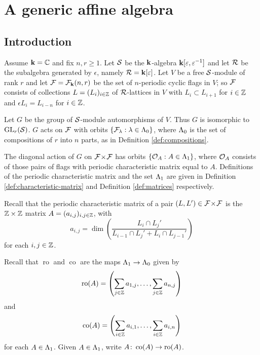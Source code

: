 \documentclass[a4paper, 11pt]{report}
\begin{document}
\chapter{A generic affine algebra}

\section{Introduction}

Assume $\mathbf{k} = \mathbb{C}$ and fix $n,r\geq 1$. Let $\mathcal{S}$ be the $\mathbf{k}$-algebra $\mathbf{k}[\varepsilon,\varepsilon^{-1}]$ and let $\mathcal{R}$ be the subalgebra generated by $\epsilon$, namely $\mathcal{R}=\mathbf{k}[\varepsilon]$. Let $V$ be a free $\mathcal{S}$-module of rank $r$ and let $\mathcal{F} = \mathcal{F}_{\mathbf{k}}(n,r)$ be the set of $n$-periodic cyclic flags in $V$; so $\mathcal{F}$ consists of collections $L = (L_i)_{i\in\mathbb{Z}}$ of $\mathcal{R}$-lattices in $V$ with $L_i\subset L_{i+1}$ for $i\in\mathbb{Z}$ and $\epsilon L_i = L_{i-n}$ for $i\in\mathbb{Z}$.

Let $G$ be the group of $\mathcal{S}$-module automorphisms of $V$. Thus $G$ is isomorphic to $\operatorname{GL}_{r}(\mathcal{S})$. $G$ acts on $\mathcal{F}$ with orbits $\{\mathcal{F}_\lambda:\lambda\in\Lambda_0{}\}$, where $\Lambda_0{}$ is the set of compositions of $r$ into $n$ parts, as in Definition \ref{def:compositions}.

The diagonal action of $G$ on ${\mathcal{F}\!\times\!\mathcal{F}}$ has orbits $\{\mathcal{O}_{A}:A\in\Lambda_1{}\}$, where $\mathcal{O}_{A}$ consists of those pairs of flags with periodic characteristic matrix equal to $A$. Definitions of the periodic characteristic matrix and the set $\Lambda_1{}$ are given in Definition \ref{def:characteristic-matrix} and Definition \ref{def:matrices} respectively.

Recall that the periodic characteristic matrix of a pair $(L,L')\in{\mathcal{F}\!\times\!\mathcal{F}}$ is the $\mathbb{Z}\times\mathbb{Z}$ matrix $A = (a_{i,j})_{i,j\in\mathbb{Z}}$, with
\begin{equation*}
a_{i,j} = \dim\left(\frac{L_i\cap L_j'}{L_{i-1}\cap L_j' + L_i\cap L_{j-1}'}\right)
\end{equation*}
for each $i,j\in\mathbb{Z}$.

Recall that $\operatorname{ro}$ and $\operatorname{co}$ are the maps $\Lambda_1{}\to\Lambda_0{}$ given by
\begin{equation*}
\operatorname{ro}(A) = \left(\sum_{j\in\mathbb{Z}} a_{1,j},\ldots, \sum_{j\in\mathbb{Z}}a_{n,j}\right)
\end{equation*}
and
\begin{equation*}
\operatorname{co}(A) = \left(\sum_{i\in\mathbb{Z}} a_{i,1},\ldots, \sum_{i\in\mathbb{Z}} a_{i,n}\right)
\end{equation*}
for each $A\in\Lambda_1{}$. Given $A\in\Lambda_1{}$, write $A\colon\operatorname{co}(A)\to\operatorname{ro}(A)$.
\end{document}

